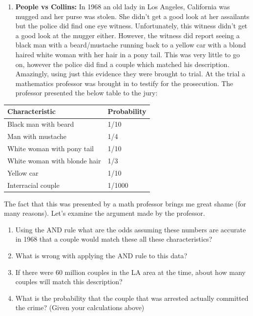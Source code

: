 \documentclass[
]{book}
\providecommand{\tightlist}{%
  \setlength{\itemsep}{0pt}\setlength{\parskip}{0pt}}
\theoremstyle{definition}
\theoremstyle{definition}
\theoremstyle{definition}
\theoremstyle{definition}
\theoremstyle{remark}
\begin{document}
\begin{enumerate}
\def\labelenumi{\arabic{enumi}.}
\tightlist
\item
  \textbf{People vs Collins:} In 1968 an old lady in Los Angeles, California was mugged and her purse was stolen. She didn't get a good look at her assailants but the police did find one eye witness. Unfortunately, this witness didn't get a good look at the mugger either. However, the witness did report seeing a black man with a beard/mustache running back to a yellow car with a blond haired white woman with her hair in a pony tail. This was very little to go on, however the police did find a couple which matched his description. Amazingly, using just this evidence they were brought to trial. At the trial a mathematics professor was brought in to testify for the prosecution. The professor presented the below table to the jury:
\end{enumerate}

\begin{longtable}[]{@{}ll@{}}
\toprule()
Characteristic & Probability \\
\midrule()
\endhead
Black man with beard & 1/10 \\
Man with mustache & 1/4 \\
White woman with pony tail & 1/10 \\
White woman with blonde hair & 1/3 \\
Yellow car & 1/10 \\
Interracial couple & 1/1000 \\
\bottomrule()
\end{longtable}

The fact that this was presented by a math professor brings me great shame (for many reasons). Let's examine the argument made by the professor.

\begin{enumerate}
\def\labelenumi{\arabic{enumi}.}
\tightlist
\item
  Using the AND rule what are the odds assuming these numbers are accurate in 1968 that a couple would match these all these characteristics?
\item
  What is wrong with applying the AND rule to this data?
\item
  If there were 60 million couples in the LA area at the time, about how many couples will match this description?
\item
  What is the probability that the couple that was arrested actually committed the crime? (Given your calculations above)
\end{enumerate}
\end{document}
